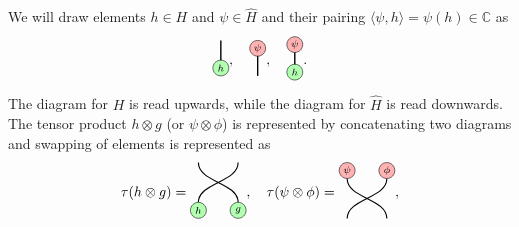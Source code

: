 \documentclass[a4paper,11pt]{article}
\theoremstyle{theorem}
\theoremstyle{remark}
\newcommand{\Cbb}{\mathbb{C}}
\begin{document}
We will draw elements $h\in H$ and $\psi \in \hat{H}$ and their pairing $\langle \psi, h\rangle=\psi(h)\in \Cbb$ as
\begin{equation}
\begin{aligned}
\begin{tikzpicture}
    \draw[black, line width=1.0pt] (0,0) -- (0,0.7);    
   \filldraw[green!30, draw=black] (0,0) circle (0.2);
    \node at (0, 0) {$\scriptstyle h$};
\end{tikzpicture}
\end{aligned}, \quad 
\begin{aligned}
\begin{tikzpicture}
    \draw[black, line width=1.0pt] (0,0) -- (0,-0.7);    
    \filldraw[red!30, draw=black] 
       (0,0) circle (0.2);
    \node at (0, 0) {$\scriptstyle \psi$};
\end{tikzpicture}
\end{aligned},\quad 
\begin{aligned}
\begin{tikzpicture}
    \draw[black, line width=1.0pt] (0,0) -- (0,0.7);    
    \filldraw[red!30, draw=black] 
       (0,0.7) circle (0.2);
    \node at (0, 0.7) {$\scriptstyle \psi$};
      \filldraw[green!30, draw=black] 
       (0,0) circle (0.2);
    \node at (0, 0) {$\scriptstyle h$};
\end{tikzpicture}
\end{aligned}.
\end{equation}
The diagram for $H$ is read upwards, while the diagram for $\hat{H}$ is read downwards.
The tensor product $h\otimes g$ (or $\psi\otimes \phi$) is represented by concatenating two diagrams and swapping of elements is represented as 
\begin{equation}
\tau (h\otimes g)=
\begin{aligned}
     \begin{tikzpicture}
    \draw[thick] (0, 2) .. controls (0, 1.5) and (1, 1.5) .. (1, 1);
    \draw[thick] (1, 2) .. controls (1, 1.5) and (0, 1.5) .. (0, 1);
    \filldraw[green!30, draw=black] 
       (0,0.8) circle (0.2);
    \node at (0, 0.8) {$\scriptstyle h$};
    \filldraw[green!30, draw=black] 
       (1,0.8) circle (0.2);
    \node at (1, 0.8) {$\scriptstyle g$};
\end{tikzpicture}  
\end{aligned},
\quad 
\tau (\psi\otimes \phi)=
\begin{aligned}
\begin{tikzpicture}
    \draw[thick] (0, 2) .. controls (0, 1.5) and (1, 1.5) .. (1, 1);
    \draw[thick] (1, 2) .. controls (1, 1.5) and (0, 1.5) .. (0, 1);
    \filldraw[red!30, draw=black] 
       (0,2.2) circle (0.2);
    \node at (0, 2.2) {$\scriptstyle \psi$}; 
    \filldraw[red!30, draw=black] 
        (1,2.2) circle (0.2);
    \node at (1, 2.2) {$\scriptstyle \phi$};
\end{tikzpicture}
\end{aligned},
\end{equation}
\end{document}

